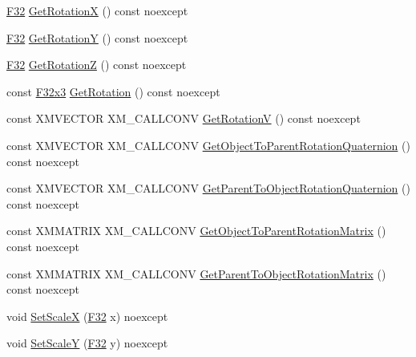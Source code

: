 \begin{DoxyCompactItemize}
\item 
\mbox{\hyperlink{namespacemage_aa97e833b45f06d60a0a9c4fc22ae02c0}{F32}} \mbox{\hyperlink{classmage_1_1_local_transform_af60f86fbaa2dc4562d67100215a63a61}{Get\+RotationX}} () const noexcept
\item 
\mbox{\hyperlink{namespacemage_aa97e833b45f06d60a0a9c4fc22ae02c0}{F32}} \mbox{\hyperlink{classmage_1_1_local_transform_a7d6b4eba97d85e80dacb6dc663c17e9c}{Get\+RotationY}} () const noexcept
\item 
\mbox{\hyperlink{namespacemage_aa97e833b45f06d60a0a9c4fc22ae02c0}{F32}} \mbox{\hyperlink{classmage_1_1_local_transform_ae56bae1d47047892c6588a1fe3f115ad}{Get\+RotationZ}} () const noexcept
\item 
const \mbox{\hyperlink{namespacemage_a0fef5ab4e073c2d9ea876fefa3da4233}{F32x3}} \mbox{\hyperlink{classmage_1_1_local_transform_a06ddc0ea860a58ed7d47abc115ea70e3}{Get\+Rotation}} () const noexcept
\item 
const X\+M\+V\+E\+C\+T\+OR X\+M\+\_\+\+C\+A\+L\+L\+C\+O\+NV \mbox{\hyperlink{classmage_1_1_local_transform_a489f350ed2e1e7eea1d168502cd03e88}{Get\+RotationV}} () const noexcept
\item 
const X\+M\+V\+E\+C\+T\+OR X\+M\+\_\+\+C\+A\+L\+L\+C\+O\+NV \mbox{\hyperlink{classmage_1_1_local_transform_a5d9cb07de3b11b31665f2bb35580febc}{Get\+Object\+To\+Parent\+Rotation\+Quaternion}} () const noexcept
\item 
const X\+M\+V\+E\+C\+T\+OR X\+M\+\_\+\+C\+A\+L\+L\+C\+O\+NV \mbox{\hyperlink{classmage_1_1_local_transform_a66e6d3320e87461203f91599e23ee6c1}{Get\+Parent\+To\+Object\+Rotation\+Quaternion}} () const noexcept
\item 
const X\+M\+M\+A\+T\+R\+IX X\+M\+\_\+\+C\+A\+L\+L\+C\+O\+NV \mbox{\hyperlink{classmage_1_1_local_transform_a43be02da78f59f2e6ab5d5719816498b}{Get\+Object\+To\+Parent\+Rotation\+Matrix}} () const noexcept
\item 
const X\+M\+M\+A\+T\+R\+IX X\+M\+\_\+\+C\+A\+L\+L\+C\+O\+NV \mbox{\hyperlink{classmage_1_1_local_transform_a5054e57409d6852adcde6283ca8a5c49}{Get\+Parent\+To\+Object\+Rotation\+Matrix}} () const noexcept
\item 
void \mbox{\hyperlink{classmage_1_1_local_transform_afaab2f329bb986de112e76ba8407b84e}{Set\+ScaleX}} (\mbox{\hyperlink{namespacemage_aa97e833b45f06d60a0a9c4fc22ae02c0}{F32}} x) noexcept
\item 
void \mbox{\hyperlink{classmage_1_1_local_transform_a17297480169c047f0a08c2022b69fc42}{Set\+ScaleY}} (\mbox{\hyperlink{namespacemage_aa97e833b45f06d60a0a9c4fc22ae02c0}{F32}} y) noexcept

\end{DoxyCompactItemize}
